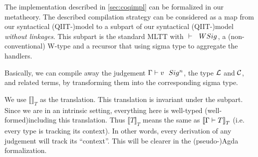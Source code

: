 The implementation described in \cref{sec:coqimpl} can be formalized in our metatheory. The described compilation strategy can be considered as a map from our syntactical (QIIT-)model to a subpart of our syntactical (QIIT-)model \textit{without linkages}. This subpart is the standard MLTT with ${ {} \vdash {} \ \ WSig^{} }$, a (non-conventional) W-type and a recursor that using sigma type to aggregate the handlers.  

Basically, we can compile away the judgement ${ {\Gamma} \vdash {v} \ \ Sig^{n} }$, the type ${\mathcal{L}}$ and ${\mathcal{C}}$, and related terms, by transforming them into the corresponding sigma type.

 

\newcommand{\denotesT}[1]{{{\llbracket {#1} \rrbracket}_T}}
\newcommand{\Sigr}[2]{{ "Sig"^r~{#1}~{#2} }}

We use $\denotesT{}$ as the translation. This translation is invariant under the subpart. Since we are in an intrinsic setting, everything here is well-typed (well-formed)including this translation. Thus $\denotesT{T}$ means the same as $\denotesT{\goodType{\Gamma}{T}{}}$ (i.e. every type is tracking its context). In other words, every derivation of any judgement will track its ``context''. This will be clearer in the (pseudo-)Agda formalization.

